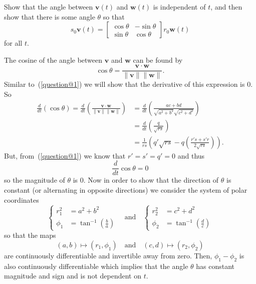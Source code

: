 \documentclass{exam}
\begin{document}
\begin{questions}
    \question Show that the angle between $\mathbf{v}(t)$ and $\mathbf{w}(t)$ is independent of $t$, and then show that there is some angle $\theta$ so that 
    \[
        s_0\mathbf{v}(t) = \begin{bmatrix}
            \cos \theta & -\sin\theta \\
            \sin \theta & \cos\theta 
        \end{bmatrix} 
        r_0\mathbf{w}(t)
    \]
    for all $t$. 
    \begin{solution}
        The cosine of the angle between $\mathbf{v}$ and $\mathbf{w}$ can be found by 
        \[
            \cos \theta = \frac{\mathbf{v} \cdot \mathbf{w}}{\|\mathbf{v}\| \|\mathbf{w}\|}.
        \]
        Similar to~(\ref{question@1}) we will show that the derivative of this expression is $0$.
        So
        \begin{align*}
            \frac{d}{dt}(\cos \theta) = \frac{d}{dt}\left(\frac{\mathbf{v} \cdot \mathbf{w}}{\|\mathbf{v}\| \|\mathbf{w}\|}\right) &= \frac{d}{dt}\left(\frac{ac + bd}{\sqrt{a^2 + b^2}\sqrt{c^2 + d^2}}\right) \\
            &= \frac{d}{dt}\left(\frac{q}{\sqrt{rs}}\right) \\
            &= \frac{1}{rs}\left(q'\sqrt{rs} - q\left(\frac{r's + s'r}{2\sqrt{rs}}\right)\right).
        \end{align*}
        But, from~(\ref{question@1}) we know that $r' = s' = q' = 0$ and thus 
        \[
            \frac{d}{dt}\cos \theta = 0
        \]
        so the magnitude of $\theta$ is $0$. Now in order to show that the direction of $\theta$ is constant (or alternating in opposite directions) we consider the system of polar coordinates 
        \[
            \begin{cases}
                r_1^2 &= a^2 + b^2 \\
                \phi_1 &= \tan^{-1}\left(\frac{b}{a}\right)
            \end{cases} 
            \quad \text{and} \quad
            \begin{cases}
                r_2^2 &= c^2 + d^2 \\
                \phi_2 &= \tan^{-1}\left(\frac{d}{c}\right)
            \end{cases}
        \]
        so that the maps 
        \[
            (a, b) \mapsto (r_1, \phi_1) \quad\text{and}\quad (c, d) \mapsto (r_2, \phi_2)
        \]
        are continuously differentiable and invertible away from zero. Then, $\phi_1 - \phi_2$ is also continuously differentiable which implies that the angle $\theta$ has constant magnitude and sign and is not dependent on $t$.
    \end{solution}
    

\end{questions}
\end{document}
